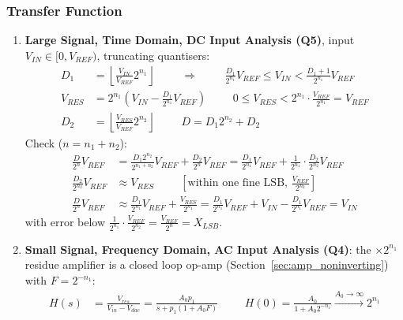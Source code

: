 \subsubsection{Transfer Function}
\begin{enumerate}
  \item \textbf{Large Signal, Time Domain, DC Input Analysis (Q5)}, input
\(V_{IN} \in [0, V_{REF})\), truncating quantisers:
\begin{align*}
  D_1 &= \left\lfloor \frac{V_{IN}}{V_{REF}} 2^{n_1} \right\rfloor \hspace{1cm} \Rightarrow \hspace{1cm}
  \frac{D_1}{2^{n_1}} V_{REF} \leq V_{IN} < \frac{D_1 + 1}{2^{n_1}} V_{REF} \\
  V_{RES} &= 2^{n_1}\left(V_{IN} - \frac{D_1}{2^{n_1}} V_{REF}\right) \hspace{1cm}
  0 \leq V_{RES} < 2^{n_1}\cdot\frac{V_{REF}}{2^{n_1}} = V_{REF} \\
  D_2 &= \left\lfloor \frac{V_{RES}}{V_{REF}} 2^{n_2} \right\rfloor \hspace{1cm}
  D = D_1 2^{n_2} + D_2
\end{align*}
Check (\(n = n_1 + n_2\)):
\begin{align*}
  \frac{D}{2^n} V_{REF} &= \frac{D_1 2^{n_2}}{2^{n_1 + n_2}} V_{REF} + \frac{D_2}{2^{n}} V_{REF} = \frac{D_1}{2^{n_1}} V_{REF} + \frac{1}{2^{n_1}}\cdot\frac{D_2}{2^{n_2}} V_{REF} \\
  \frac{D_2}{2^{n_2}} V_{REF} &\approx V_{RES} \hspace{1cm} [\text{within one fine LSB, } \tfrac{V_{REF}}{2^{n_2}}] \\
  \frac{D}{2^n} V_{REF} &\approx \frac{D_1}{2^{n_1}} V_{REF} + \frac{V_{RES}}{2^{n_1}} = \frac{D_1}{2^{n_1}} V_{REF} + V_{IN} - \frac{D_1}{2^{n_1}} V_{REF} = V_{IN}
\end{align*}
with error below \(\frac{1}{2^{n_1}}\cdot\frac{V_{REF}}{2^{n_2}} = \frac{V_{REF}}{2^n} = X_{LSB}\).
  \item \textbf{Small Signal, Frequency Domain, AC Input Analysis (Q4)}: the \(\times 2^{n_1}\) residue
    amplifier is a closed loop op-amp (Section~\ref{sec:amp_noninverting}) with \(F = 2^{-n_1}\):
    \begin{align*}
      H(s) &= \frac{V_{res}}{V_{in} - V_{dac}} = \frac{A_0 p_1}{s + p_1(1 + A_0 F)} \hspace{1cm} H(0) = \frac{A_0}{1 + A_0 2^{-n_1}} \xrightarrow{A_0 \to \infty} 2^{n_1} \tag{1}
    \end{align*}
\end{enumerate}

